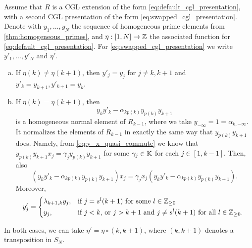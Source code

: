 \begin{theorem}\label{thm:y_prime_swapped_cgl}
	Assume that $R$ is a CGL extension of the form \eqref{eq:default_cgl_presentation}, with a second CGL presentation of the form \eqref{eq:swapped_cgl_presentation}. Denote with $y_1, \dots, y_N$ the sequence of homogeneous prime elements from \cref{thm:homogeneous_primes}, and $\eta : [1, N] \to \mathbb{Z}$ the associated function for \eqref{eq:default_cgl_presentation}. For \eqref{eq:swapped_cgl_presentation} we write $y'_1, \dots, y'_N$ and $\eta'$.
	\begin{enumerate}[(a)]
		\item If $\eta(k) \neq \eta(k+1)$, then $y'_j = y_j$ for $j \neq k, k+1$ and $y'_k = y_{k+1},
			      y'_{k+1} = y_k$.

		\item \label{itm:eta_k_is_eta_k_plus_one} If $\eta(k) = \eta(k+1)$,
		      then
		      \begin{equation*}
			      y_k y'_k - \alpha_{k p(k)} y_{p(k)} y_{k+1}
		      \end{equation*}
		      is a homogeneous normal element of $R_{k-1}$, where we take $y_{-\infty} = 1 =
			      \alpha_{k, -\infty}$. It normalizes the elements of $R_{k-1}$ in exactly the same way that $y_{p(k)}y_{k+1}$ does. Namely, from \cref{eq:y_x_quasi_commute} we know that $y_{p(k)}y_{k+1}
			      x_j = \gamma_j y_{p(k)}y_{k+1}$ for some $\gamma_j \in \mathbb{K}$ for each $j \in [1, k-1]$.
		      Then, also
		      \begin{equation*}
			      (y_ky'_k - \alpha_{kp(k)}y_{p(k)}y_{k+1})x_j = \gamma_j x_j (y_ky'_k - \alpha_{kp(k)}y_{p(k)}y_{k+1}).
		      \end{equation*}
		      Moreover,
		      \begin{equation}\label{eq:y_prime_in_swapped_cgl}
			      y'_j = \begin{dcases*}
				      \lambda_{k+1,k}y_j, & if $j=s^l(k+1)$ for some $l \in \bbZ_{\geq 0}$                               \\
				      y_j,                & if $j < k$, or $j>k+1$ and $j \neq s^l (k+1)$ for all $l \in \bbZ_{\geq 0}$.
			      \end{dcases*}
		      \end{equation}
	\end{enumerate}
	In both cases, we can take $\eta' = \eta \circ (k,k+1)$, where $(k, k+1)$ denotes a transposition in $S_N$.
\end{theorem}
